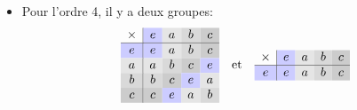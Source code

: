 {\begin{td-sol}[]
\begin{itemize}
            \begin{equation*}
                \begin{array}{c|ccc} %
                    \times & \cellcolor{blue!20}e & \cellcolor{gray!20}a & \cellcolor{gray!30}b \\
                    \hline %
                    \cellcolor{blue!20}e & \cellcolor{blue!20}e & \cellcolor{gray!20}a & \cellcolor{gray!30}b \\
                    \cellcolor{gray!20}a & \cellcolor{gray!20}a & \cellcolor{gray!30}b & \cellcolor{blue!20}e \\
                    \cellcolor{gray!30}b & \cellcolor{gray!30}b & \cellcolor{blue!20}e & \cellcolor{gray!20}a \\
                \end{array}
            \end{equation*}
            \item Pour l'ordre 4, il y a deux groupes:
            \begin{equation*}
                \begin{array}{c|cccc} %
                    \times & \cellcolor{blue!20}e & \cellcolor{gray!20}a & \cellcolor{gray!30}b & \cellcolor{gray!40}c \\
                    \hline %
                    \cellcolor{blue!20}e & \cellcolor{blue!20}e & \cellcolor{gray!20}a & \cellcolor{gray!30}b & \cellcolor{gray!40}c \\
                    \cellcolor{gray!20}a & \cellcolor{gray!20}a & \cellcolor{gray!30}b & \cellcolor{gray!40}c & \cellcolor{blue!20}e \\
                    \cellcolor{gray!30}b & \cellcolor{gray!30}b & \cellcolor{gray!40}c & \cellcolor{blue!20}e & \cellcolor{gray!20}a \\
                    \cellcolor{gray!40}c & \cellcolor{gray!40}c & \cellcolor{blue!20}e & \cellcolor{gray!20}a & \cellcolor{gray!30}b \\
                \end{array}
                \quad \text{et} \quad
                \begin{array}{c|cccc} %
                    \times & \cellcolor{blue!20}e & \cellcolor{gray!20}a & \cellcolor{gray!30}b & \cellcolor{gray!40}c \\
                    \hline %
                    \cellcolor{blue!20}e & \cellcolor{blue!20}e & \cellcolor{gray!20}a & \cellcolor{gray!30}b & \cellcolor{gray!40}c \\

\end{array}
\end{equation*}
\end{itemize}
\end{td-sol}}
